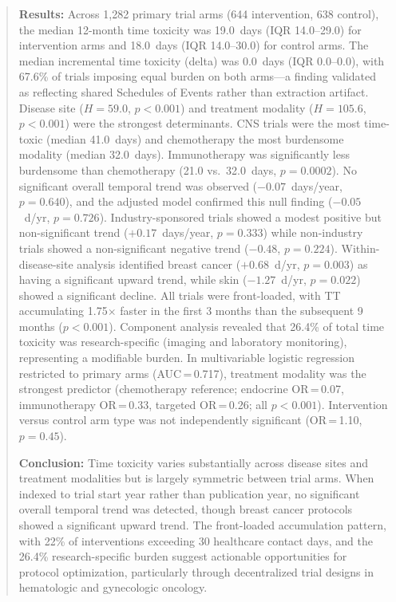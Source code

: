 \documentclass[11pt,a4paper]{article}
\begin{document}
\begin{abstract}
\noindent\textbf{Results:} Across 1{,}282 primary trial arms (644 intervention, 638 control), the median 12-month time toxicity was 19.0~days (IQR 14.0--29.0) for intervention arms and 18.0~days (IQR 14.0--30.0) for control arms. The median incremental time toxicity (delta) was 0.0~days (IQR 0.0--0.0), with 67.6\% of trials imposing equal burden on both arms---a finding validated as reflecting shared Schedules of Events rather than extraction artifact. Disease site ($H=59.0$, $p<0.001$) and treatment modality ($H=105.6$, $p<0.001$) were the strongest determinants. CNS trials were the most time-toxic (median 41.0~days) and chemotherapy the most burdensome modality (median 32.0~days). Immunotherapy was significantly less burdensome than chemotherapy (21.0 vs.\ 32.0~days, $p=0.0002$). No significant overall temporal trend was observed ($-0.07$~days/year, $p=0.640$), and the adjusted model confirmed this null finding ($-0.05$~d/yr, $p=0.726$). Industry-sponsored trials showed a modest positive but non-significant trend ($+0.17$~days/year, $p=0.333$) while non-industry trials showed a non-significant negative trend ($-0.48$, $p=0.224$). Within-disease-site analysis identified breast cancer ($+0.68$~d/yr, $p=0.003$) as having a significant upward trend, while skin ($-1.27$~d/yr, $p=0.022$) showed a significant decline. All trials were front-loaded, with TT accumulating 1.75$\times$ faster in the first 3 months than the subsequent 9 months ($p<0.001$). Component analysis revealed that 26.4\% of total time toxicity was research-specific (imaging and laboratory monitoring), representing a modifiable burden. In multivariable logistic regression restricted to primary arms (AUC\,=\,0.717), treatment modality was the strongest predictor (chemotherapy reference; endocrine OR\,=\,0.07, immunotherapy OR\,=\,0.33, targeted OR\,=\,0.26; all $p<0.001$). Intervention versus control arm type was not independently significant (OR\,=\,1.10, $p=0.45$).

\noindent\textbf{Conclusion:} Time toxicity varies substantially across disease sites and treatment modalities but is largely symmetric between trial arms. When indexed to trial start year rather than publication year, no significant overall temporal trend was detected, though breast cancer protocols showed a significant upward trend. The front-loaded accumulation pattern, with 22\% of interventions exceeding 30 healthcare contact days, and the 26.4\% research-specific burden suggest actionable opportunities for protocol optimization, particularly through decentralized trial designs in hematologic and gynecologic oncology.
\end{abstract}
\end{document}
